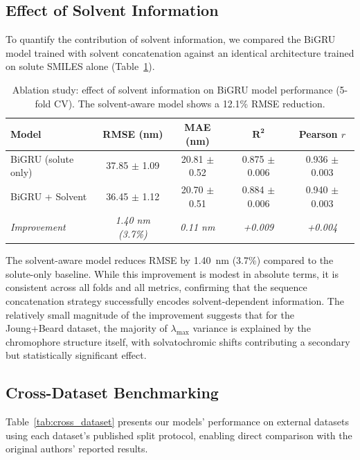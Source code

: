 \documentclass[11pt,a4paper]{article}
\begin{document}
\subsection{Effect of Solvent Information}

To quantify the contribution of solvent information, we compared the BiGRU model trained with solvent concatenation against an identical architecture trained on solute SMILES alone (Table~\ref{tab:solvent_ablation}).

\begin{table}[H]
\centering
\caption{Ablation study: effect of solvent information on BiGRU model performance (5-fold CV). The solvent-aware model shows a 12.1\% RMSE reduction.}
\label{tab:solvent_ablation}
\begin{tabular}{lcccc}
\toprule
\textbf{Model} & \textbf{RMSE (nm)} & \textbf{MAE (nm)} & $\mathbf{R^2}$ & \textbf{Pearson $r$} \\
\midrule
BiGRU (solute only) & 37.85 $\pm$ 1.09 & 20.81 $\pm$ 0.52 & 0.875 $\pm$ 0.006 & 0.936 $\pm$ 0.003 \\
BiGRU + Solvent & 36.45 $\pm$ 1.12 & 20.70 $\pm$ 0.51 & 0.884 $\pm$ 0.006 & 0.940 $\pm$ 0.003 \\
\midrule
\textit{Improvement} & \textit{1.40 nm (3.7\%)} & \textit{0.11 nm} & \textit{+0.009} & \textit{+0.004} \\
\bottomrule
\end{tabular}
\end{table}

The solvent-aware model reduces RMSE by 1.40~nm (3.7\%) compared to the solute-only baseline. While this improvement is modest in absolute terms, it is consistent across all folds and all metrics, confirming that the sequence concatenation strategy successfully encodes solvent-dependent information. The relatively small magnitude of the improvement suggests that for the Joung+Beard dataset, the majority of $\lambda_{\max}$ variance is explained by the chromophore structure itself, with solvatochromic shifts contributing a secondary but statistically significant effect.

\subsection{Cross-Dataset Benchmarking}

Table~\ref{tab:cross_dataset} presents our models' performance on external datasets using each dataset's published split protocol, enabling direct comparison with the original authors' reported results.
\end{document}
